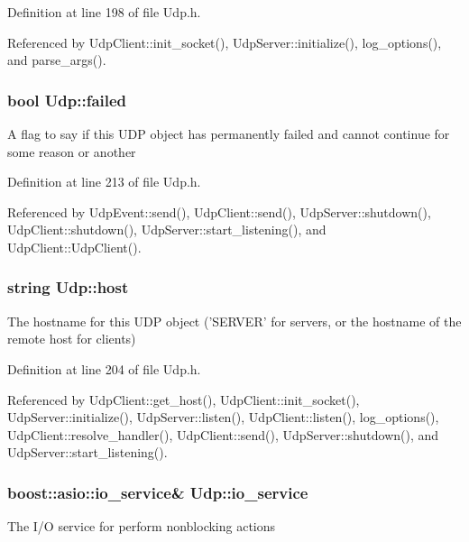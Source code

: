 Definition at line 198 of file Udp.h.



Referenced by UdpClient::init\_\-socket(), UdpServer::initialize(), log\_\-options(), and parse\_\-args().

\hypertarget{classUdp_a91a6ea6959febc662830e818b89ed884}{
\subsubsection[{failed}]{\setlength{\rightskip}{0pt plus 5cm}bool {\bf Udp::failed}}}
\label{classUdp_a91a6ea6959febc662830e818b89ed884}
A flag to say if this UDP object has permanently failed and cannot continue for some reason or another 

Definition at line 213 of file Udp.h.



Referenced by UdpEvent::send(), UdpClient::send(), UdpServer::shutdown(), UdpClient::shutdown(), UdpServer::start\_\-listening(), and UdpClient::UdpClient().

\hypertarget{classUdp_a798fd48815d9d97045e8e6a3a290d301}{
\subsubsection[{host}]{\setlength{\rightskip}{0pt plus 5cm}string {\bf Udp::host}}}
\label{classUdp_a798fd48815d9d97045e8e6a3a290d301}
The hostname for this UDP object ('SERVER' for servers, or the hostname of the remote host for clients) 

Definition at line 204 of file Udp.h.



Referenced by UdpClient::get\_\-host(), UdpClient::init\_\-socket(), UdpServer::initialize(), UdpServer::listen(), UdpClient::listen(), log\_\-options(), UdpClient::resolve\_\-handler(), UdpClient::send(), UdpServer::shutdown(), and UdpServer::start\_\-listening().

\hypertarget{classUdp_a7e143116ab3a0f478c8461ca04af782b}{
\subsubsection[{io\_\-service}]{\setlength{\rightskip}{0pt plus 5cm}boost::asio::io\_\-service\& {\bf Udp::io\_\-service}}}
\label{classUdp_a7e143116ab3a0f478c8461ca04af782b}
The I/O service for perform nonblocking actions 

